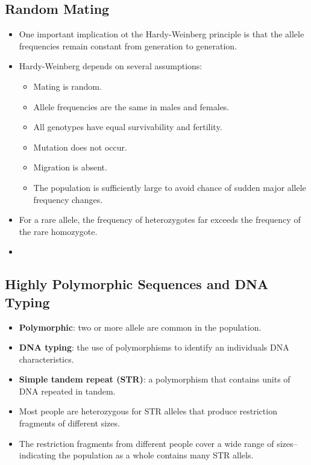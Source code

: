 \documentclass[12pt,a4paper]{article}
\begin{document}
\subsection{Random Mating} 
\begin{itemize}
    \item One important implication ot the Hardy-Weinberg principle is that the allele frequencies remain constant from generation to generation.
    \item Hardy-Weinberg depends on several assumptions:
        \begin{itemize}
            \item Mating is random.
            \item Allele frequencies are the same in males and females.
            \item All genotypes have equal survivability and fertility.
            \item Mutation does not occur.
            \item Migration is absent.
            \item The population is sufficiently large to avoid chance of sudden major allele frequency changes.
        \end{itemize}
    \item For a rare allele, the frequency of heterozygotes far exceeds the frequency of the rare homozygote.
    \item 
\end{itemize}

\subsection{Highly Polymorphic Sequences and DNA Typing}
\begin{itemize}
    \item \textbf{Polymorphic}: two or more allele are common in the population.
    \item \textbf{DNA typing}: the use of polymorphisms to identify an individuals DNA characteristics.
    \item \textbf{Simple tandem repeat (STR)}: a polymorphism that contains units of DNA repeated in tandem.
    \item Most people are heterozygous for STR alleles that produce restriction fragments of different sizes.
    \item The restriction fragments from different people cover a wide range of sizes-- indicating the population as a whole contains many STR allels.
\end{itemize}
\end{document}
